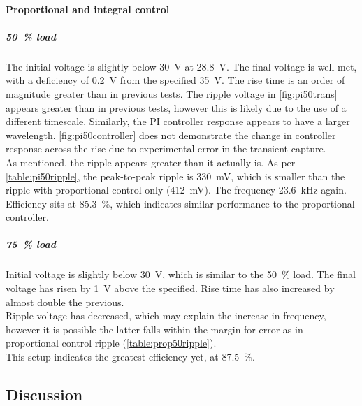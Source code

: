 \paragraph{Proportional and integral control}
\subparagraph{\qty{50}{\percent} load}
The initial voltage is slightly below \qty{30}{\volt} at \qty{28.8}{\volt}. The final voltage is
well met, with a deficiency of \qty{0.2}{\volt} from the specified \qty{35}{\volt}. The rise time
is an order of magnitude greater than in previous tests. The ripple voltage in \autoref{fig:pi50trans}
appears greater than in previous tests, however this is likely due to the use of a different timescale.
Similarly, the PI controller response appears to have a larger wavelength. \autoref{fig:pi50controller}
does not demonstrate the change in controller response across the rise due to experimental error in
the transient capture.\\
As mentioned, the ripple appears greater than it actually is. As per \autoref{table:pi50ripple}, the
peak-to-peak ripple is \qty{330}{\mV}, which is smaller than the ripple with proportional control
only (\qty{412}{\mV}). The frequency \qty{23.6}{\kHz} again. \\
Efficiency sits at \qty{85.3}{\percent}, which indicates similar performance to the proportional
controller.
\subparagraph{\qty{75}{\percent} load}
Initial voltage is slightly below \qty{30}{\volt}, which is similar to the \qty{50}{\percent} load.
The final voltage has risen by \qty{1}{\volt} above the specified. Rise time has also increased
by almost double the previous.\\
Ripple voltage has decreased, which may explain the increase in frequency, however it is possible
the latter falls within the margin for error as in proportional control ripple
(\autoref{table:prop50ripple}). \\
This setup indicates the greatest efficiency yet, at \qty{87.5}{\percent}.

\subsection{Discussion}

